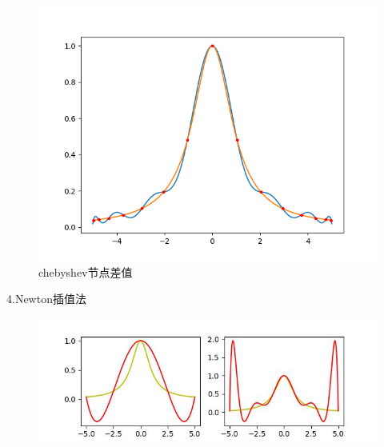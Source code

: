 \begin{figure}[htbp]
{\begin{minipage}[b]{.4\linewidth}
            \includegraphics[scale=0.29]{pic/chebyshev/14.png}
        \end{minipage}
    }
    \caption{chebyshev节点差值}
\end{figure}
4.Newton插值法
\begin{figure}[htbp]
    \centering

    {
        \begin{minipage}[b]{.9\linewidth}
            \centering
            \includegraphics[scale=0.6]{pic/newton(1).png}
        \end{minipage}
    }


\end{figure}
